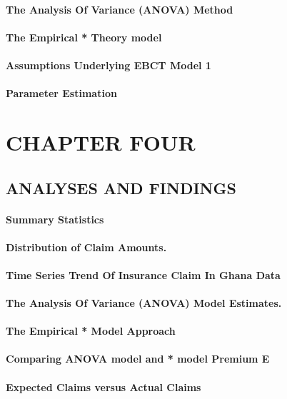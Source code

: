 \documentclass[10pt]{report}
\begin{document}
\begin{flushleft}
		\subsubsection{The Analysis Of Variance (ANOVA) Method}
		\subsubsection{The Empirical * Theory model}
		\subsubsection{Assumptions Underlying EBCT Model 1}
		\subsubsection{Parameter Estimation}
		\chapter{CHAPTER  FOUR}
		\section{ANALYSES AND FINDINGS}
		\subsubsection{Summary Statistics}
		\subsubsection{Distribution of Claim Amounts.}
		\subsubsection{Time Series Trend Of Insurance  Claim In  Ghana Data}
		\subsubsection{The Analysis Of Variance (ANOVA) Model Estimates.}
		\subsubsection{The Empirical * Model Approach}
		\subsubsection{Comparing ANOVA model and * model Premium E}
		\subsubsection{Expected Claims versus Actual Claims}

\end{flushleft}
\end{document}
